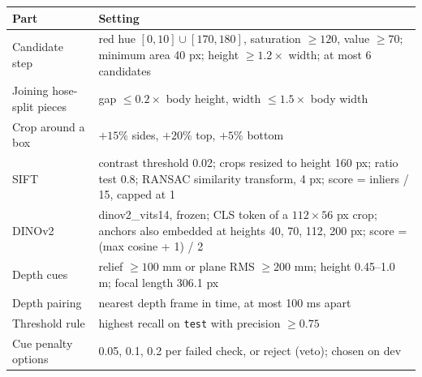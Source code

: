 \begin{tabular}{lp{10.5cm}}
\toprule
Part & Setting \\
\midrule
Candidate step & red hue $[0,10]\cup[170,180]$, saturation $\ge 120$, value $\ge 70$; minimum area 40 px; height $\ge 1.2\times$ width; at most 6 candidates \\
Joining hose-split pieces & gap $\le 0.2\times$ body height, width $\le 1.5\times$ body width \\
Crop around a box & $+15\%$ sides, $+20\%$ top, $+5\%$ bottom \\
SIFT & contrast threshold 0.02; crops resized to height 160 px; ratio test 0.8; RANSAC similarity transform, 4 px; score = inliers / 15, capped at 1 \\
DINOv2 & dinov2\_vits14, frozen; CLS token of a $112\times56$ px crop; anchors also embedded at heights 40, 70, 112, 200 px; score = (max cosine + 1) / 2 \\
Depth cues & relief $\ge 100$ mm or plane RMS $\ge 200$ mm; height 0.45--1.0 m; focal length 306.1 px \\
Depth pairing & nearest depth frame in time, at most 100 ms apart \\
Threshold rule & highest recall on \texttt{test} with precision $\ge 0.75$ \\
Cue penalty options & 0.05, 0.1, 0.2 per failed check, or reject (veto); chosen on dev \\
\bottomrule
\end{tabular}
